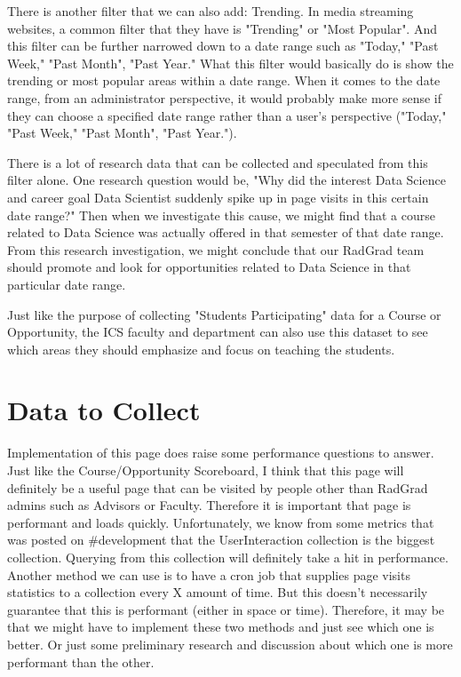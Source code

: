 \documentclass[english]{proposalnsf}
\begin{document}
    There is another filter that we can also add: Trending.
    In media streaming websites, a common filter that they have is "Trending" or "Most Popular".
    And this filter can be further narrowed down to a date range such as "Today," "Past Week," "Past Month", "Past Year." What this filter would basically do is show the trending or most popular areas within a date range.
    When it comes to the date range, from an administrator perspective, it would probably make more sense if they can choose a specified date range rather than a user's perspective ("Today," "Past Week," "Past Month", "Past Year.").

    There is a lot of research data that can be collected and speculated from this filter alone.
    One research question would be, "Why did the interest Data Science and career goal Data Scientist suddenly spike up in page visits in this certain date range?" Then when we investigate this cause, we might find that a course related to Data Science was actually offered in that semester of that date range.
    From this research investigation, we might conclude that our RadGrad team should promote and look for opportunities related to Data Science in that particular date range.

    Just like the purpose of collecting "Students Participating" data for a Course or Opportunity, the ICS faculty and department can also use this dataset to see which areas they should emphasize and focus on teaching the students.

    \section{Data to Collect}
    \label{sec:data-to-collect}
    Implementation of this page does raise some performance questions to answer.
    Just like the Course/Opportunity Scoreboard, I think that this page will definitely be a useful page that can be visited by people other than RadGrad admins such as Advisors or Faculty.
    Therefore it is important that page is performant and loads quickly.
    Unfortunately, we know from some metrics that was posted on \#development that the UserInteraction collection is the biggest collection.
    Querying from this collection will definitely take a hit in performance.
    Another method we can use is to have a cron job that supplies page visits statistics to a collection every X amount of time.
    But this doesn't necessarily guarantee that this is performant (either in space or time).
    Therefore, it may be that we might have to implement these two methods and just see which one is better.
    Or just some preliminary research and discussion about which one is more performant than the other.

    
    

    \appendix
\end{document}
